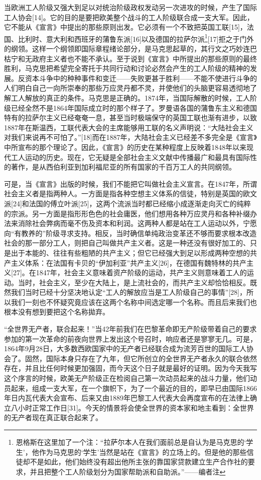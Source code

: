 \documentclass[UTF8,zihao=-4,a4paper]{ctexart}
\begin{document}
当欧洲工人阶级又强大到足以对统治阶级政权发动另一次进攻的时候，产生了国际工人协会[14]。它的目的是要把欧美整个战斗的工人阶级联合成一支大军。因此，它不能从《宣言》中提出的那些原则出发。它必须有一个不致把英国工联[15]，法国、比利时、意大利和西班牙的蒲鲁东派[16]以及德国的拉萨尔派\footnote{恩格斯在这里加了一个注：“拉萨尔本人在我们面前总是自认为是马克思的‘学生’，他作为马克思的‘学生’当然是站在《宣言》的立场上的。但是他的那些信徒却不是如此，他们始终没有超出他所主张的靠国家贷款建立生产合作社的要求，并且把整个工人阶级划分为国家帮助派和自助派。”——编者注}[17]拒之于门外的纲领。这样一个纲领即国际章程绪论部分，是马克思起草的，其行文之巧妙连巴枯宁和无政府主义者也不能不承认。至于说到《宣言》中所提出的那些原则的最终胜利，马克思把希望完全寄托于共同行动和讨论必然会产生的工人阶级的精神的发展。反资本斗争中的种种事件和变迁——失败更甚于胜利——不能不使进行斗争的人们明白自己一向所崇奉的那些万应灵丹都不灵，并使他们的头脑更容易透彻地了解工人解放的真正的条件。马克思是正确的。1874年，当国际解散的时候，工人阶级已经全然不是1864年国际成立时的那个样子了。罗曼语各国的蒲鲁东主义和德国特有的拉萨尔主义已经奄奄一息，甚至当时极端保守的英国工联也渐有进步，以致1887年在斯温西，工联代表大会的主席能够用工联的名义声明说：“大陆社会主义对我们来说再不可怕了。”[18]而在1887年，大陆社会主义已经差不多完全是《宣言》中所宣布的那个理论了。因此，《宣言》的历史在某种程度上反映着1848年以来现代工人运动的历史。现在，它无疑是全部社会主义文献中传播最广和最具有国际性的著作，是从西伯利亚到加利福尼亚的所有国家的千百万工人的共同纲领。\par
可是，当《宣言》出版的时候，我们不能把它叫做社会主义宣言。在1847年，所谓社会主义者是指两种人。一方面是指各种空想主义体系的信徒，特别是英国的欧文派[24]和法国的傅立叶派[25]，这两个流派当时都已经缩小成逐渐走向灭亡的纯粹的宗派。另一方面是指形形色色的社会庸医，他们想用各种万应灵丹和各种补缀办法来消除社会弊病而毫不伤及资本和利润。这两种人都是站在工人运动以外，宁愿向“有教养的”阶级寻求支持。相反，当时确信单纯政治变革还不够而要求根本改造社会的那一部分工人，则把自己叫做共产主义者。这是一种还没有很好加工的、只是出于本能的、往往有些粗陋的共产主义；但它已经强大到足以形成两种空想的共产主义体系：在法国有卡贝的“伊加利亚”共产主义[26]，在德国有魏特林的共产主义[27]。在1847年，社会主义意味着资产阶级的运动，共产主义则意味着工人的运动。当时，社会主义，至少在大陆上，是上流社会的，而共产主义却恰恰相反。既然我们当时已经十分坚决地认定“工人的解放应当是工人阶级自己的事情”[28]，所以我们一刻也不怀疑究竟应该在这两个名称中间选定哪一个名称。而且后来我们也根本没有想到要把这个名称拋弃。\par
“全世界无产者，联合起来！”当42年前我们在巴黎革命即无产阶级带着自己的要求参加的第一次革命的前夜向世界上发出这个号召时，响应者还是寥寥无几。可是，1864年9月28日，大多数西欧国家中的无产者已经联合成为流芳百世的国际工人协会了。固然，国际本身只存在了九年，但它所创立的全世界无产者永久的联合依然存在，并且比任何时候更加强固，而今天这个日子就是最好的证明。因为今天我写这个序言的时候，欧美无产阶级正在检阅自己第一次动员起来的战斗力量，他们动员起来，组成一支大军，在一个旗帜下，为了一个最近的目的，即早已由国际1866年日内瓦代表大会宣布、后来又由1889年巴黎工人代表大会再度宣布的在法律上确立八小时正常工作日[31]。今天的情景将会使全世界的资本家和地主看到：全世界的无产者现在真正联合起来了。\par
\end{document}
